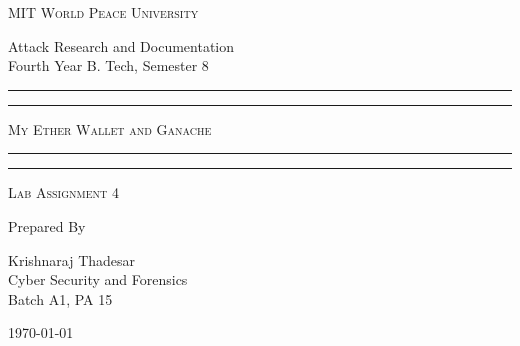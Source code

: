 \documentclass[11pt]{article}
\begin{document}
\begin{titlepage}
	\centering


	\huge\textsc{
		MIT World Peace University
	}\\

	\vspace{0.75\baselineskip} %

	\LARGE{
		Attack Research and Documentation\\
		Fourth Year B. Tech, Semester 8
	}

	\vfill %


	\rule{\textwidth}{1.6pt}\vspace*{-\baselineskip}\vspace*{2pt}
	\rule{\textwidth}{0.6pt}
	\vspace{0.75\baselineskip} %

	\huge{\textsc{
        My Ether Wallet and Ganache
    }} \\

	\vspace{0.5\baselineskip} %
	\rule{\textwidth}{0.6pt}\vspace*{-\baselineskip}\vspace*{2.8pt}
	\rule{\textwidth}{1.6pt}

	\vspace{1\baselineskip} %


	\LARGE\textsc{
		Lab Assignment 4
	} %
	\vfill


	Prepared By \vspace{0.5\baselineskip} %

	\Large{
		Krishnaraj Thadesar \\
		Cyber Security and Forensics\\
        Batch A1, PA 15
	}

	\vspace{0.5\baselineskip} %
	\today

\end{titlepage}
\end{document}
